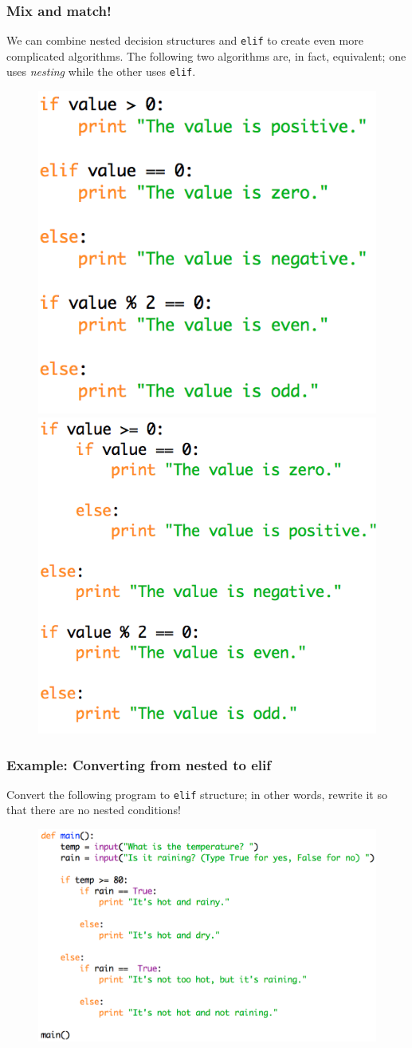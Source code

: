 \documentclass{beamer}
\begin{document}
\begin{frame}[fragile]
\frametitle{Mix and match!}

We can combine nested decision structures and \verb|elif| to create even more complicated algorithms. The following two algorithms are, in fact, equivalent; one uses \emph{nesting} while the other uses \verb|elif|.


\begin{figure}[h]
\includegraphics[width=.45\linewidth]{IMG/mixandmatch.png}\hfill
\includegraphics[width=.45\linewidth]{IMG/mixandmatch2.png}
\end{figure}


\end{frame}


\begin{frame}[fragile]
\frametitle{Example: Converting from nested to elif}

Convert the following program to \verb|elif| structure; in other words, rewrite it so that there are no nested conditions!
\\
\begin{figure}
\centering
\includegraphics[scale=0.6]{IMG/nested_ex.png}
\end{figure}
\end{frame}
\end{document}
